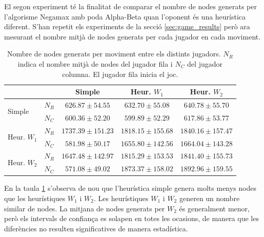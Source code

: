 \documentclass[12pt,a4paper]{article}
\begin{document}
El segon experiment té la finalitat de comparar el nombre de nodes generats per l'algorisme Negamax amb poda Alpha-Beta quan l'oponent és una heurística diferent. S'han repetit els experiments de la secció \ref{sec:game_results} però ara mesurant el nombre mitjà de nodes generats per cada jugador en cada moviment.\\

\begin{table}[h]
\centering
\begin{tabular}{|l|l|c|c|c|}
\hline
\multicolumn{2}{|c|}{} & Simple & Heur. $W_1$ & Heur. $W_2$\\
\hline
\multirow{2}{*}{Simple} & $N_R$ & $626.87 \pm 54.55$ & $632.70 \pm 55.08$ & $640.78 \pm 55.70$\\
&  $N_C$ & $600.36 \pm 52.20$ & $599.89 \pm 52.29$ & $617.86 \pm 53.77$\\
\hline
\multirow{2}{*}{Heur. $W_1$} & $N_R$ & $1737.39 \pm 151.23$ & $1818.15 \pm 155.68$ & $1840.16 \pm 157.47$ \\
& $N_C$ & $581.98 \pm 50.17$ & $1655.80 \pm 142.56$ & $1664.04 \pm 143.28$ \\
\hline
\multirow{2}{*}{Heur. $W_2$} & $N_R$ & $1647.48 \pm 142.97$ & $1815.29 \pm 153.53$  &  $1841.40 \pm 155.73$ \\
& $N_C$ & $571.08 \pm 49.02$ & $1873.37 \pm 158.02$ & $1892.96 \pm 159.55$\\
\hline
\end{tabular}
\caption{Nombre de nodes generats per moviment entre els distints jugadors. $N_R$ indica el nombre mitjà de nodes del jugador fila i $N_C$ del jugador columna. El jugador fila inicia el joc.}
\label{tab:expr_nodes}
\end{table}

En la taula \ref{tab:expr_nodes} s'observa  de nou que l'heurística simple genera molts menys nodes que les heurístiques $W_1$ i $W_2$. Les heurístiques $W_1$ i $W_2$ generen un nombre similar de nodes. La mitjana de nodes generats per $W_2$ és generalment menor, però els intervals de confiança es solapen en totes les ocasions, de manera que les diferències no resulten significatives de manera estadística.\\
\end{document}
